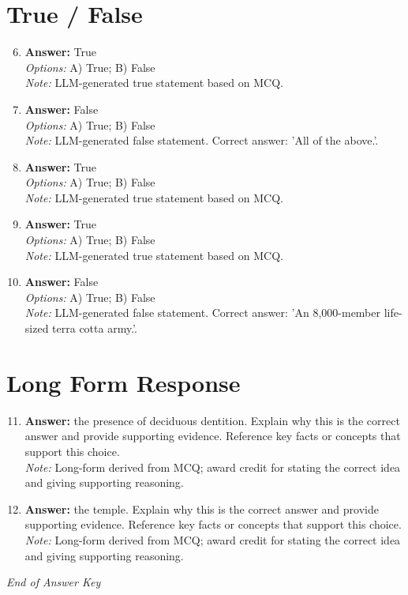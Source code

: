 \documentclass[12pt]{article}
\begin{document}
\section*{True / False}
\begin{enumerate}[label=\arabic*.]
\setcounter{enumi}{5}
\item \textbf{Answer:} True
\\ \textit{Options:} A) True; B) False
\\ \textit{Note:} LLM-generated true statement based on MCQ.
\item \textbf{Answer:} False
\\ \textit{Options:} A) True; B) False
\\ \textit{Note:} LLM-generated false statement. Correct answer: 'All of the above.'.
\item \textbf{Answer:} True
\\ \textit{Options:} A) True; B) False
\\ \textit{Note:} LLM-generated true statement based on MCQ.
\item \textbf{Answer:} True
\\ \textit{Options:} A) True; B) False
\\ \textit{Note:} LLM-generated true statement based on MCQ.
\item \textbf{Answer:} False
\\ \textit{Options:} A) True; B) False
\\ \textit{Note:} LLM-generated false statement. Correct answer: 'An 8,000-member life-sized terra cotta army.'.
\end{enumerate}

\section*{Long Form Response}
\begin{enumerate}[label=\arabic*.]
\setcounter{enumi}{10}
\item \textbf{Answer:} the presence of deciduous dentition. Explain why this is the correct answer and provide supporting evidence. Reference key facts or concepts that support this choice.
\\ \textit{Note:} Long-form derived from MCQ; award credit for stating the correct idea and giving supporting reasoning.
\item \textbf{Answer:} the temple. Explain why this is the correct answer and provide supporting evidence. Reference key facts or concepts that support this choice.
\\ \textit{Note:} Long-form derived from MCQ; award credit for stating the correct idea and giving supporting reasoning.
\end{enumerate}

\vfill
\noindent\textit{End of Answer Key}
\end{document}
